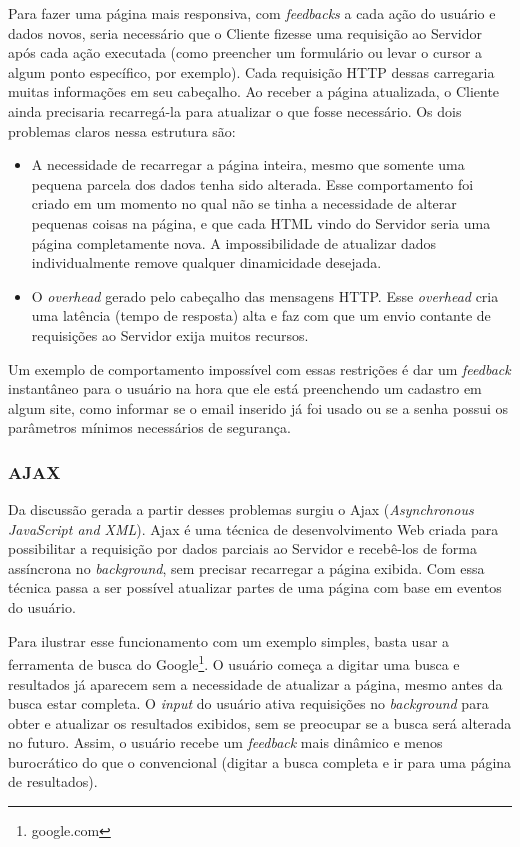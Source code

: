\documentclass[a4paper,12pt]{article}
\begin{document}
Para fazer uma página mais responsiva, com \emph{feedbacks} a cada ação do usuário e dados novos, seria necessário que o Cliente fizesse uma requisição ao Servidor após cada ação executada (como preencher um formulário ou levar o cursor a algum ponto específico, por exemplo). Cada requisição HTTP dessas carregaria muitas informações em seu cabeçalho. Ao receber a página atualizada, o Cliente ainda precisaria recarregá-la para atualizar o que fosse necessário. Os dois problemas claros nessa estrutura são:

\begin{itemize}
    \item A necessidade de recarregar a página inteira, mesmo que somente uma pequena parcela dos dados tenha sido alterada. Esse comportamento foi criado em um momento no qual não se tinha a necessidade de alterar pequenas coisas na página, e que cada HTML vindo do Servidor seria uma página completamente nova. A impossibilidade de atualizar dados individualmente remove qualquer dinamicidade desejada.

    \item O \emph{overhead} gerado pelo cabeçalho das mensagens HTTP. Esse \emph{overhead} cria uma latência (tempo de resposta) alta e faz com que um envio contante de requisições ao Servidor exija muitos recursos.
\end{itemize}

Um exemplo de comportamento impossível com essas restrições é dar um \emph{feedback} instantâneo para o usuário na hora que ele está preenchendo um cadastro em algum site, como informar se o email inserido já foi usado ou se a senha possui os parâmetros mínimos necessários de segurança.

\subsubsection{AJAX}

Da discussão gerada a partir desses problemas surgiu o Ajax (\emph{Asynchronous JavaScript and XML}). Ajax é uma técnica de desenvolvimento Web criada para possibilitar a requisição por dados parciais ao Servidor e recebê-los de forma assíncrona no \emph{background}, sem precisar recarregar a página exibida. Com essa técnica passa a ser possível atualizar partes de uma página com base em eventos do usuário.

Para ilustrar esse funcionamento com um exemplo simples, basta usar a ferramenta de busca do Google\footnote{google.com}. O usuário começa a digitar uma busca e resultados já aparecem sem a necessidade de atualizar a página, mesmo antes da busca estar completa. O \emph{input} do usuário ativa requisições no \emph{background} para obter e atualizar os resultados exibidos, sem se preocupar se a busca será alterada no futuro. Assim, o usuário recebe um \emph{feedback} mais dinâmico e menos burocrático do que o convencional (digitar a busca completa e ir para uma página de resultados).
\end{document}
